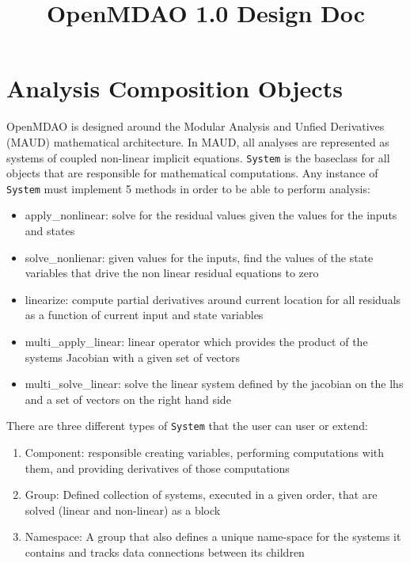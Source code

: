 \documentclass[12pt]{article}
\title {OpenMDAO 1.0 Design Doc}
\newcommand{\classname}[1]{\texttt{#1}}
\begin{document}
\maketitle

\section{Analysis Composition Objects}

OpenMDAO is designed around the Modular Analysis and Unfied Derivatives (MAUD) mathematical
architecture. In MAUD, all analyses are represented as systems of coupled non-linear implicit equations.
\classname{System} is the baseclass for all objects that are responsible for mathematical computations.
Any instance of \classname{System} must implement 5 methods in order to be able to perform
analysis:

\begin{itemize}
    \item apply\_nonlinear: solve for the residual values given the values for
    the inputs and states
    \item solve\_nonlienar: given values for the inputs, find the values of the
    state variables that drive the non linear residual equations to zero
    \item linearize: compute partial derivatives around current location for all
    residuals as a function of current input and state variables
    \item multi\_apply\_linear: linear operator which provides the product of the systems
    Jacobian with a given set of vectors
    \item multi\_solve\_linear: solve the linear system defined by the jacobian on the
    lhs and a set of vectors on the right hand side
\end{itemize}

There are three different types of \classname{System} that the user can user or extend:
\begin{enumerate}
    \item Component: responsible creating variables, performing computations with them, and providing derivatives of those computations
    \item Group: Defined collection of systems, executed in a given order, that are solved (linear and non-linear) as a block
    \item Namespace: A group that also defines a unique name-space for the systems it contains and tracks data connections between its children
\end{enumerate}
\end{document}
